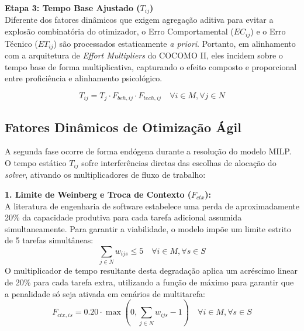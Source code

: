 \documentclass[a4paper,11pt]{article}
\begin{document}
\vspace{0.2cm}
\noindent\textbf{Etapa 3: Tempo Base Ajustado ($T_{ij}$)} \\
Diferente dos fatores dinâmicos que exigem agregação aditiva para evitar a explosão combinatória do otimizador, o Erro Comportamental ($EC_{ij}$) e o Erro Técnico ($ET_{ij}$) são processados estaticamente \textit{a priori}. Portanto, em alinhamento com a arquitetura de \textit{Effort Multipliers} do COCOMO II, eles incidem sobre o tempo base de forma multiplicativa, capturando o efeito composto e proporcional entre proficiência e alinhamento psicológico.

\begin{equation}
    T_{ij} = T_j \cdot F_{beh, ij} \cdot F_{tech, ij} \quad \forall i \in M, \forall j \in N
\end{equation}

\vspace{0.3cm}
\subsection{Fatores Dinâmicos de Otimização Ágil}

A segunda fase ocorre de forma endógena durante a resolução do modelo MILP. 
O tempo estático $T_{ij}$ sofre interferências diretas das escolhas de alocação 
do \textit{solver}, ativando os multiplicadores de fluxo de trabalho:

\vspace{0.2cm}
\noindent\textbf{1. Limite de Weinberg e Troca de Contexto ($F_{ctx}$):} \\
A literatura de engenharia de software \citep{weinberg1992} estabelece uma perda de aproximadamente 20\% da capacidade produtiva para cada tarefa adicional assumida simultaneamente. Para garantir a viabilidade, o modelo impõe um limite estrito de 5 tarefas simultâneas:
\begin{equation}
    \sum_{j \in N} w_{ijs} \le 5 \quad \forall i \in M, \forall s \in S
\end{equation}
O multiplicador de tempo resultante desta degradação aplica um acréscimo linear de 20\% para cada tarefa extra, utilizando a função de máximo para garantir que a penalidade só seja ativada em cenários de multitarefa:
\begin{equation}
    F_{ctx, is} = 0.20 \cdot \max\left(0, \sum_{j \in N} w_{ijs} - 1\right) \quad \forall i \in M, \forall s \in S
\end{equation}
\end{document}
